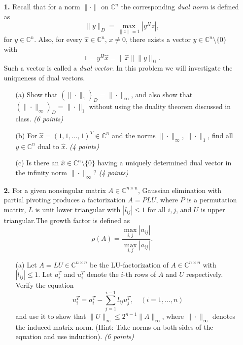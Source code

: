 \documentclass[10pt]{report}
\begin{document}
\begin{enumerate}
    
\item[\textbf{1.}] Recall that for a norm $\|\cdot\|$ on $\mathbb{C}^n$ the corresponding \textit{dual norm} is defined as \[\| y \|_D= \max_{\|z\|=1} |y^Hz|,\]
for $y \in \mathbb{C}^n$. Also, for every $\hat{x} \in \mathbb{C}^n$, $x \neq 0$, there exists a vector $y \in \mathbb{C}^n \setminus \{0\}$ with
\[1 = y^H \hat{x} = \|\hat{x}\|\|y\|_D.\] 
Such a vector is called a \textit{dual vector}. In this problem we will investigate the uniqueness of dual vectors.
  \begin{enumerate}
    \item[(a)] Show that $(\|\cdot\|_1)_D=\|\cdot\|_{\infty}$, and also show that
      $(\|\cdot\|_{\infty})_D=\|\cdot\|_{1}$ without using the duality theorem discussed in class. \textit{(6 points)}

  \item[(b)] For $\hat{x}= (1, 1, \ldots, 1)^T \in \mathbb{C}^{n}$ and the norms $\| \cdot \|_{\infty}$, $\| \cdot \|_{1}$, find all $y\in\mathbb{C}^{n}$ dual to $\hat{x}$. \textit{(4 points)}

    \item[(c)] Is there an $\hat{x}\in\mathbb{C}^{n}\setminus\{0\}$ having a uniquely determined dual vector in the infinity norm $\|\cdot\|_{\infty}$? \textit{(4 points)}
  \end{enumerate}

\vspace{0.1cm} 

\item[\textbf{2.}] For a given nonsingular matrix $A\in\mathbb{C}^{n\times n}$, Gaussian elimination with partial pivoting produces a factorization $A=PLU$, where $P$ is a permutation matrix, $L$ is unit lower triangular with $|l_{ij}|\leq1$ for all $i,j$, and $U$ is upper triangular.The growth factor is defined as\[\rho(A)=\frac{\max_{i,j}|u_{ij}|}{\max_{i,j}|a_{ij}|}.\]

  \begin{enumerate}

\item[(a)] Let $A = LU \in \mathbb{C}^{n \times n}$ be the LU-factorization of $A \in \mathbb{C}^{n \times n}$ with $|l_{ij}| \leq 1$. Let $a_i^T$ and $u_i^T$ denote the $i$-th rows of $A$ and $U$ respectively. Verify the equation
\[u_i^{T}=a_i^T-\sum_{j=1}^{i-1}l_{ij}u_j^T, \,\,\,\,\,\,(i= 1, \ldots, n)\] 
and use it to show that $\|U\|_{\infty} \leq 2^{n-1}\|A\|_{\infty}$, where $\|\cdot\|_{\infty}$ denotes the induced matrix norm. (Hint: Take norms on both sides of the equation and use induction). \textit{(6 points)}


\end{enumerate}
\end{enumerate}
\end{document}
